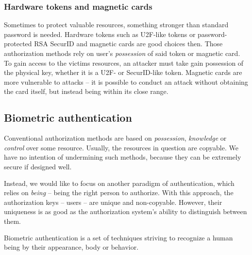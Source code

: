         \subsubsection*{Hardware tokens and magnetic cards}
            Sometimes to protect valuable resources,
            something stronger than standard password is needed.
            Hardware tokens such as U2F-like tokens or password-protected RSA SecurID
            and magnetic cards are good choices then.
            Those authorization methods rely on user's
            \textit{possession} of said token or magnetic card. To
            gain access to the victims resources, an attacker must take gain
            possession of the physical key, whether it is a U2F- or SecurID-like token.
            Magnetic cards are more vulnerable to attacks -- it is possible to
            conduct an attack without obtaining the card itself, but instead
            being within its close range.

    \subsection{Biometric authentication}
        Conventional authorization methods are based on \textit{possession},
        \textit{knowledge} or \textit{control} over some resource. Usually, the
        resources in question are copyable.
        We have no intention of undermining such methods, because they can be
        extremely secure if designed well.

        Instead, we would like to focus on another paradigm of authentication,
        which relies on \textit{being} -- being the right person to authorize.
        With this approach, the authorization keys -- users -- are unique and non-copyable. However,
        their uniqueness is as good as the authorization system's ability to
        distinguish between them.

        Biometric authentication is a set of techniques striving to recognize a
        human being by their appearance, body or behavior.

